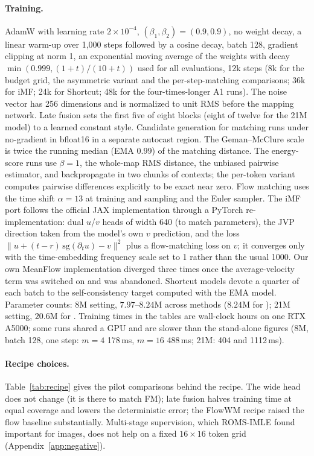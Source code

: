 \paragraph{Training.}
AdamW with learning rate $2\times10^{-4}$, $(\beta_1, \beta_2) = (0.9, 0.9)$, no weight decay, a linear warm-up over 1{,}000 steps followed by a cosine decay, batch 128, gradient clipping at norm 1, an exponential moving average of the weights with decay $\min(0.999, (1 + t)/(10 + t))$ used for all evaluations, 12k steps (8k for the budget grid, the asymmetric variant and the per-step-matching comparisons; 36k for iMF; 24k for Shortcut; 48k for the four-times-longer A1 runs). The noise vector has 256 dimensions and is normalized to unit RMS before the mapping network. Late fusion sets the first five of eight blocks (eight of twelve for the 21M model) to a learned constant style. Candidate generation for matching runs under no-gradient in bfloat16 in a separate autocast region. The Geman--McClure scale is twice the running median (EMA $0.99$) of the matching distance. The energy-score runs use $\beta = 1$, the whole-map RMS distance, the unbiased pairwise estimator, and backpropagate in two chunks of contexts; the per-token variant computes pairwise differences explicitly to be exact near zero. Flow matching uses the time shift $\alpha = 13$ at training and sampling and the Euler sampler. The iMF port follows the official JAX implementation through a PyTorch re-implementation: dual $u$/$v$ heads of width 640 (to match parameters), the JVP direction taken from the model's own $v$ prediction, and the loss $\|u + (t - r)\,\mathrm{sg}(\partial_t u) - v\|^2$ plus a flow-matching loss on $v$; it converges only with the time-embedding frequency scale set to 1 rather than the usual 1000. Our own MeanFlow implementation diverged three times once the average-velocity term was switched on and was abandoned. Shortcut models devote a quarter of each batch to the self-consistency target computed with the EMA model. Parameter counts: 8M setting, $7.97$--$8.24$M across methods ($8.24$M for \imlewm{}); 21M setting, $20.6$M for \imlewm{}. Training times in the tables are wall-clock hours on one RTX A5000; some runs shared a GPU and are slower than the stand-alone figures (8M, batch 128, one step: $m{=}4$ 178\,ms, $m{=}16$ 488\,ms; 21M: 404 and 1112\,ms).

\paragraph{Recipe choices.}
Table~\ref{tab:recipe} gives the pilot comparisons behind the recipe. The wide head does not change \imlewm{} (it is there to match FM); late fusion halves training time at equal coverage and lowers the deterministic error; the FlowWM recipe raised the flow baseline substantially. Multi-stage supervision, which ROMS-IMLE found important for images, does not help on a fixed $16\times16$ token grid (Appendix~\ref{app:negative}).

